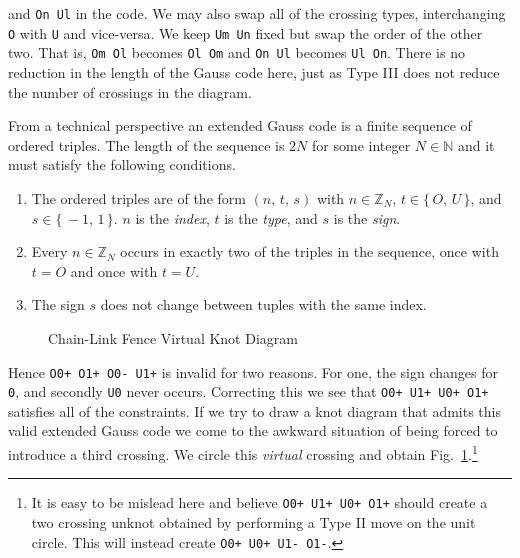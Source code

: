         and \texttt{On Ul} in the code. We may also swap all of the crossing
        types, interchanging \texttt{O} with \texttt{U} and vice-versa.
        We keep \texttt{Um Un} fixed but swap the order of the other two.
        That is, \texttt{Om Ol} becomes \texttt{Ol Om} and
        \texttt{On Ul} becomes \texttt{Ul On}. There is no reduction in the
        length of the Gauss code here, just as Type III does not reduce the
        number of crossings in the diagram.
        \par\hfill\par
        From a technical perspective an extended Gauss code is a
        finite sequence of ordered triples. The length of the sequence is
        $2N$ for some integer $N\in\mathbb{N}$ and it must satisfy
        the following conditions.
        \begin{enumerate}
            \item
                The ordered triples are of the form $(n,\,t,\,s)$ with
                $n\in\mathbb{Z}_{N}$, $t\in\{\,O,\,U\,\}$, and
                $s\in\{\,-1,\,1\,\}$. $n$ is the \textit{index}, $t$ is the
                \textit{type}, and $s$ is the \textit{sign}.
            \item
                Every $n\in\mathbb{Z}_{N}$ occurs in exactly two of the
                triples in the sequence, once with $t=O$ and once with
                $t=U$.
            \item
                The sign $s$ does not change between tuples with the same
                index.
        \end{enumerate}
        \begin{figure}
            \centering
            \caption{Chain-Link Fence Virtual Knot Diagram}
            \label{fig:chain_link_fence_knot_virtual}
        \end{figure}
        Hence \texttt{O0+ O1+ O0- U1+} is invalid for two reasons. For one,
        the sign changes for \texttt{0}, and secondly \texttt{U0} never occurs.
        Correcting this we see that \texttt{O0+ U1+ U0+ O1+} satisfies all of
        the constraints. If we try to draw a knot diagram that admits this valid
        extended Gauss code we come to the awkward situation of being forced
        to introduce a third crossing. We circle this \textit{virtual} crossing
        and obtain Fig.~\ref{fig:chain_link_fence_knot_virtual}.\footnote{%
            It is easy to be mislead here and believe
            \texttt{O0+ U1+ U0+ O1+} should create a two crossing unknot
            obtained by performing a Type II move on the unit circle. This will
            instead create \texttt{O0+ U0+ U1- O1-}.
        }
